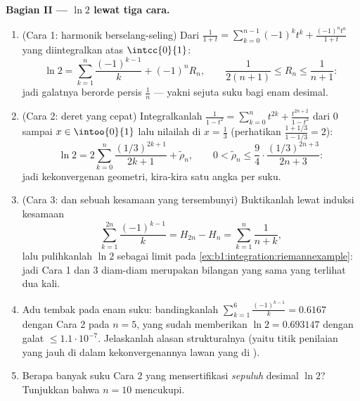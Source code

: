 \begin{problem}
\medskip
\noindent\textbf{Bagian II --- $\ln 2$ lewat tiga cara.}
\begin{enumerate}[resume]
  \item (Cara 1: harmonik berselang-seling) Dari $\frac{1}{1+t} =
        \sum_{k=0}^{n-1}(-1)^k t^k + \frac{(-1)^n t^n}{1+t}$
        yang diintegralkan atas $\intcc{0}{1}$:
        \[
        \ln 2 = \sum_{k=1}^{n} \frac{(-1)^{k-1}}{k} + (-1)^n
        R_n, \qquad \frac{1}{2(n+1)} \leq R_n \leq
        \frac{1}{n+1} :
        \]
        jadi galatnya berorde persis $\frac 1n$ --- yakni sejuta
        suku bagi enam desimal.
  \item (Cara 2: deret yang cepat) Integralkanlah $\frac{1}{1 - t^2} =
        \sum_{k=0}^{n} t^{2k} + \frac{t^{2n+2}}{1-t^2}$ dari $0$
        sampai $x \in \intoo{0}{1}$ lalu nilailah di $x = \frac13$
        (perhatikan $\frac{1 + 1/3}{1 - 1/3} = 2$):
        \[
        \ln 2 = 2\sum_{k=0}^{n} \frac{(1/3)^{2k+1}}{2k+1} +
        \tilde\rho_n,
        \qquad
        0 < \tilde\rho_n \leq \frac{9}{4}\cdot
        \frac{(1/3)^{2n+3}}{2n+3} :
        \]
        jadi kekonvergenan geometri, kira-kira satu angka per suku.
  \item (Cara 3:  dan sebuah kesamaan yang tersembunyi) Buktikanlah lewat
        induksi kesamaan
        \[
        \sum_{k=1}^{2n} \frac{(-1)^{k-1}}{k} = H_{2n} - H_n =
        \sum_{k=1}^{n} \frac{1}{n + k} ,
        \]
        lalu pulihkanlah $\ln 2$ sebagai limit  pada
        \cref{ex:b1:integration:riemannexample}: jadi Cara 1 dan 3
        diam-diam merupakan bilangan yang sama yang terlihat dua kali.
  \item Adu tembak pada enam suku: bandingkanlah $\sum_{k=1}^{6}
        \frac{(-1)^{k-1}}{k} = 0.6167$ dengan Cara 2 pada $n = 5$,
        yang sudah memberikan $\ln 2 = 0.693147$ dengan galat $\leq
        1.1\cdot10^{-7}$. Jelaskanlah alasan strukturalnya
        (yaitu titik penilaian yang jauh di dalam 
        kekonvergenannya lawan yang di ).
  \item Berapa banyak suku Cara 2 yang mensertifikasi \emph{sepuluh} desimal
        $\ln 2$? Tunjukkan bahwa $n = 10$ mencukupi.
\end{enumerate}


\end{problem}
